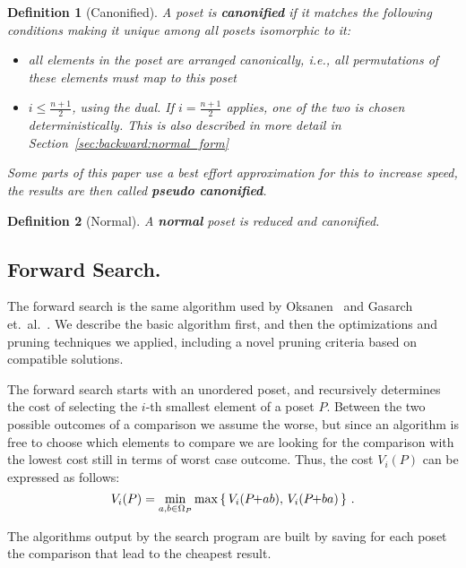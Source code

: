 \documentclass[twoside,leqno,twocolumn]{article}
\makeatletter
\newcommand\ie{i.e\@., }
\newcommand{\pchild}[3]{{#1}\kern-1pt{+}{#2}{#3}}
\newtheorem{definition}{Definition}[section]
\makeatother
\begin{document}
\begin{definition}[Canonified]
  A poset is \textbf{canonified} if it matches the following conditions making it unique among all posets isomorphic to it:
  \begin{itemize}
    \item all elements in the poset are arranged canonically, \ie all permutations of these elements must map to this poset
    \item
          $i\leq\frac{n+1}{2}$, using the dual.
          If $i = \frac{n+1}{2}$ applies, one of the two is chosen deterministically.
          This is also described in more detail in Section~\ref{sec:backward:normal_form}
  \end{itemize}

  Some parts of this paper use a best effort approximation for this to increase speed, the results are then called \textbf{pseudo canonified}.
\end{definition}

\begin{definition}[Normal]
  A \textbf{normal} poset is reduced and canonified.
\end{definition}


\subsection{Forward Search.} \label{chapter:forward_search}
The forward search is the same algorithm used by Oksanen~\cite{Oksanen2006} and Gasarch et.\ al\@.~\cite{Gasarch1996}.
We describe the basic algorithm first, and then the optimizations and pruning techniques we applied, including a novel pruning criteria based on compatible solutions.

The forward search starts with an unordered poset, and recursively determines the cost of selecting the $i$-th smallest element of a poset $P$.
Between the two possible outcomes of a comparison we assume the worse, but since an algorithm is free to choose which elements to compare we are looking for the comparison with the lowest cost still in terms of worst case outcome.
Thus, the cost $V_i(P)$ can be expressed as follows:
\begin{equation}
  V_i(P) = \min_{a,b \in \Omega_P} \max \left\{ \,V_i(\pchild{P}{a}{b}),\, V_i(\pchild{P}{b}{a})\,\right\}\,\text{.}
\end{equation}

The algorithms output by the search program are built by saving for each poset the comparison that lead to the cheapest result.
\end{document}
